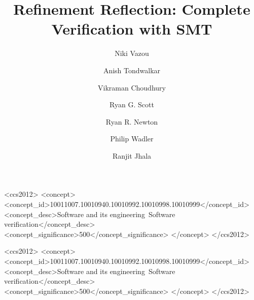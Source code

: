 \documentclass[acmsmall,screen]{acmart}
\begin{document}
\acmPrice{}

\begin{CCSXML}
<ccs2012>
<concept>
<concept_id>10011007.10010940.10010992.10010998.10010999</concept_id>
<concept_desc>Software and its engineering~Software verification</concept_desc>
<concept_significance>500</concept_significance>
</concept>
</ccs2012>
\end{CCSXML}


\title[]{Refinement Reflection: Complete Verification with SMT}


\author{Niki Vazou}




\author{Anish Tondwalkar}

\author{Vikraman Choudhury}

\author{Ryan G. Scott}

\author{Ryan R. Newton}

\author{Philip Wadler}

\author{Ranjit Jhala}

\renewcommand{\shortauthors}{N. Vazou, A. Tondwalkar, V. Choudhury, R. G. Scott, R. R. Newton, P. Wadler, and R. Jhala}

\begin{CCSXML}
<ccs2012>
<concept>
<concept_id>10011007.10010940.10010992.10010998.10010999</concept_id>
<concept_desc>Software and its engineering~Software verification</concept_desc>
<concept_significance>500</concept_significance>
</concept>
</ccs2012>
\end{CCSXML}
\end{document}
